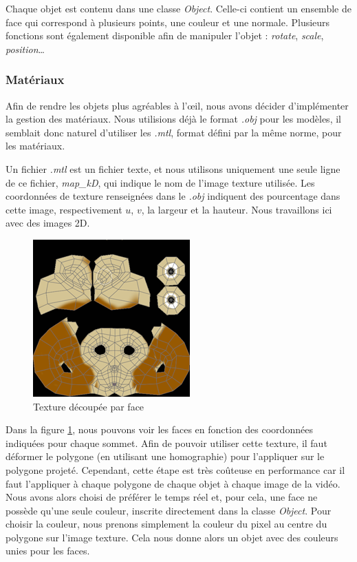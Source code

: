                 Chaque objet est contenu dans une classe \emph{Object}. Celle-ci contient un ensemble de face qui correspond à plusieurs points, une couleur et une normale. Plusieurs fonctions sont également disponible afin de manipuler l'objet : \emph{rotate}, \emph{scale}, \emph{position}\dots

            \subsubsection{Matériaux}
            \label{subsubsec:materiaux}

            Afin de rendre les objets plus agréables à l'\oe il, nous avons décider d'implémenter la gestion des matériaux. Nous utilisions déjà le format \emph{.obj} pour les modèles, il semblait donc naturel d'utiliser les \emph{.mtl}, format défini par la même norme, pour les matériaux. 

            Un fichier \emph{.mtl} est un fichier texte, et nous utilisons uniquement une seule ligne de ce fichier, \emph{map\_kD}, qui indique le nom de l'image texture utilisée. Les coordonnées de texture renseignées dans le \emph{.obj} indiquent des pourcentage dans cette image, respectivement $u$, $v$, la largeur et la hauteur. Nous travaillons ici avec des images 2D.

            \begin{figure}[h]
                \centering
                \includegraphics[scale=0.8]{img/rendu/texture.png}
                \caption{Texture découpée par face}
                \label{fig:texture}
            \end{figure}

            Dans la figure \ref{fig:texture}, nous pouvons voir les faces en fonction des coordonnées indiquées pour chaque sommet. Afin de pouvoir utiliser cette texture, il faut déformer le polygone (en utilisant une homographie) pour l'appliquer sur le polygone projeté. Cependant, cette étape est très coûteuse en performance car il faut l'appliquer à chaque polygone de chaque objet à chaque image de la vidéo. Nous avons alors choisi de préférer le temps réel et, pour cela, une face ne possède qu'une seule couleur, inscrite directement dans la classe \emph{Object}. Pour choisir la couleur, nous prenons simplement la couleur du pixel au centre du polygone sur l'image texture. Cela nous donne alors un objet avec des couleurs unies pour les faces. 
            
